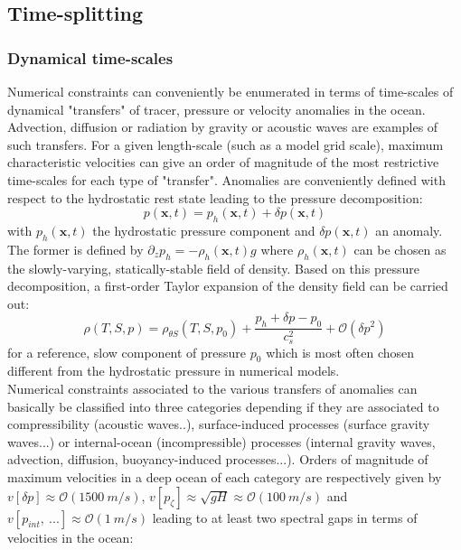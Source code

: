 \subsection{Time-splitting}
\subsubsection{Dynamical time-scales}
Numerical constraints can conveniently be enumerated in terms of time-scales of dynamical "transfers" of tracer, pressure or velocity anomalies in the ocean. Advection, diffusion or radiation by gravity or acoustic waves are examples of such transfers. For a given length-scale (such as a model grid scale), maximum characteristic velocities can give an order of magnitude of the most restrictive time-scales for each type of "transfer". Anomalies are conveniently defined with respect to the hydrostatic rest state leading to the pressure decomposition:
\begin{equation}
	\displaystyle
	\label{decompoP_0}
	p(\mathbf{x},t)=p_h(\mathbf{x},t)+\delta p(\mathbf{x},t)
\end{equation}
with $p_h(\mathbf{x},t)$ the hydrostatic pressure component and $\delta p(\mathbf{x},t)$ an anomaly. The former is defined by $\partial_z p_h=-\rho_h(\mathbf{x},t) g$ where $\rho_h(\mathbf{x},t)$ can be chosen as the slowly-varying, statically-stable field of density. Based on this pressure decomposition, a first-order Taylor expansion of the density field can be carried out:
\begin{equation}
  \displaystyle 
	\label{decompor_0}
  \rho(T,S,p)=\rho_{\theta S}(T,S,p_0)+\frac{p_h+\delta p-p_0}{c_s^2}+\mathcal{O}(\delta p^2)
\end{equation}
for a reference, slow component of pressure $p_0$ which is most often chosen different from the hydrostatic pressure in numerical models.\\
Numerical constraints associated to the various transfers of anomalies can basically be classified into three categories depending if they are associated to compressibility (acoustic waves..), surface-induced processes (surface gravity waves...) or internal-ocean (incompressible) processes (internal gravity waves, advection, diffusion, buoyancy-induced processes...). Orders of magnitude of maximum velocities in a deep ocean of each category are respectively given by $v[\delta p]\approx \mathcal{O}(1500\ m/s)$, $v[p_\zeta]\approx\sqrt{g H}\approx \mathcal{O}(100\ m/s)$ and $v[p_{int},\ ...]\approx \mathcal{O}(1\ m/s)$ leading to at least two spectral gaps in terms of velocities in the ocean:
